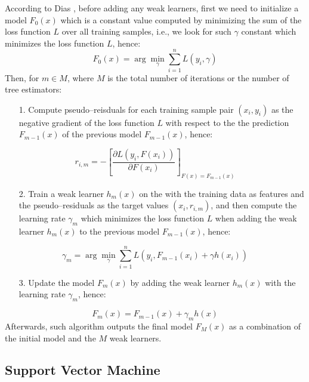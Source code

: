 According to Dias \citep{dias2018comparison}, before adding any weak learners, first we need to initialize a model $F_0(x)$ which is a constant value computed by minimizing the sum of the loss function $L$ over all training samples, i.e., we look for such $\gamma$ constant which minimizes the loss function $L$, hence:
\begin{equation}
    F_{0}(x) = \arg \min _{\gamma} \sum_{i=1}^{n} L\left(y_{i}, \gamma\right)
\end{equation}
Then, for $m \in M$, where $M$ is the total number of iterations or the number of tree estimators:
\begin{itemize}\setlength\itemsep{0em}
    \item[1.] Compute pseudo--reisduals for each training sample pair $(x_i, y_i)$ as the negative gradient of the loss function $L$ with respect to the the prediction $F_{m-1}(x)$ of the previous model $F_{m-1}(x)$, hence:
\end{itemize}
\begin{equation}
    r_{i,m} = -\left[\frac{\partial L\left(y_{i}, F\left(x_{i}\right)\right)}{\partial F\left(x_{i}\right)}\right]_{F(x)=F_{m-1}(x)}
\end{equation}
\begin{itemize}\setlength\itemsep{0em}
    \item[2.] Train a weak learner $h_m(x)$ on the with the training data as features and the pseudo--residuals as the target values $(x_i, r_{i,m})$, and then compute the learning rate $\gamma_m$ which minimizes the loss function $L$ when adding the weak learner $h_m(x)$ to the previous model $F_{m-1}(x)$, hence:
\end{itemize}
\begin{equation}
    \gamma_{m} = \arg \min _{\gamma} \sum_{i=1}^{n} L\left(y_{i}, F_{m-1}\left(x_{i}\right)+\gamma h\left(x_{i}\right)\right)
\end{equation}
\begin{itemize}\setlength\itemsep{0em}
    \item[3.] Update the model $F_m(x)$ by adding the weak learner $h_m(x)$ with the learning rate $\gamma_m$, hence:
\end{itemize}
\begin{equation}
    F_m(x) = F_{m-1}(x) + \gamma_m h(x)
\end{equation}
Afterwards, such algorithm outputs the final model $F_M(x)$ as a combination of the initial model and the $M$ weak learners.

\subsection{Support Vector Machine}

